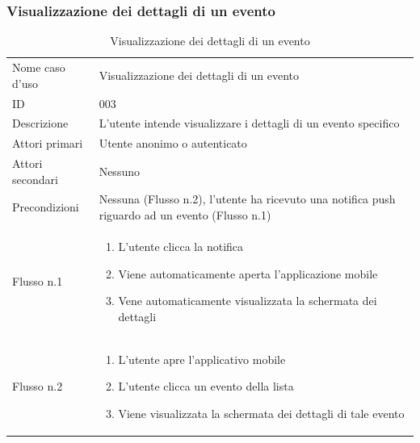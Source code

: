 \documentclass{article}
\begin{document}
\subsubsection{Visualizzazione dei dettagli di un evento}

\begin{table}[htbp]
    \label{8.2.2}
    \centering
    \begin{tabularx}{\textwidth}{| l | X |}
        \Xhline{2pt} %
        Nome caso d'uso & Visualizzazione dei dettagli di un evento\\
        \Xhline{2pt} %
        ID & 003 \\
        \hline
        Descrizione & L'utente intende visualizzare i dettagli di un evento specifico\\
        \hline
        Attori primari & Utente anonimo o autenticato\\
        \hline
        Attori secondari & Nessuno \\
        \hline
        Precondizioni & Nessuna (Flusso n.2), l'utente ha ricevuto una notifica push riguardo ad un evento (Flusso n.1)\\
        \hline
        Flusso n.1 & 
        \begin{enumerate}[topsep=5pt,partopsep=0pt,parsep=0pt,itemsep=0pt,before=\vspace{-\baselineskip},after=\vspace{-\baselineskip}] 
            \item L'utente clicca la notifica
            \item Viene automaticamente aperta l'applicazione mobile
            \item Vene automaticamente visualizzata la schermata dei dettagli
        \end{enumerate}
        \\
        \hline
        Flusso n.2 & 
        \begin{enumerate}[topsep=5pt,partopsep=0pt,parsep=0pt,itemsep=0pt,before=\vspace{-\baselineskip},after=\vspace{-\baselineskip}]                
            \item L'utente apre l'applicativo mobile
            \item L'utente clicca un evento della lista
            \item Viene visualizzata la schermata dei dettagli di tale evento
        \end{enumerate}
        \\
        \hline
    \end{tabularx}
    \caption{Visualizzazione dei dettagli di un evento}
\end{table}
\end{document}
